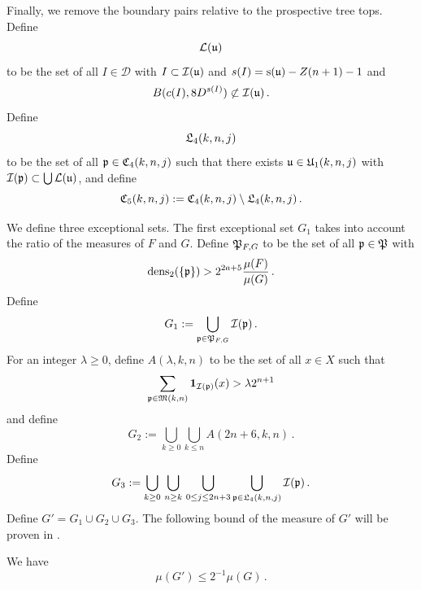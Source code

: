 Finally, we remove the boundary pairs relative to the prospective tree tops. Define
\begin{equation}
    \label{eq-L-def}
    \mathcal{L}({\mathfrak u})
\end{equation}
to be the set of all $I \in \mathcal{D}$ with $I \subset {\mathcal{I}}({\mathfrak u})$ and $s(I) = {\mathrm{s}}({\mathfrak u}) - Z(n+1) - 1$ and
\begin{equation}
    B(c(I), 8 D^{s(I)})\not \subset {\mathcal{I}}({\mathfrak u})\, .
\end{equation}
Define
\begin{equation}
    \label{eq-L4-def}
    {\mathfrak L}_4(k,n,j)
\end{equation}
to be the set of all ${\mathfrak p}\in {\mathfrak C}_4(k,n,j)$ such that there exists
${\mathfrak u}\in {\mathfrak U}_1(k,n,j)$
with ${\mathcal{I}}({\mathfrak p}) \subset \bigcup \mathcal{L}({\mathfrak u})$, and define
\begin{equation}\label{defc5}
{\mathfrak C}_5(k,n,j):={\mathfrak C}_4(k,n,j)
  \setminus {\mathfrak L}_4(k,n,j)\, .
\end{equation}


We define three exceptional sets.
The first exceptional set $G_1$ takes into account the ratio of the measures of $F$ and $G$.
Define ${\mathfrak P}_{F,G}$ to be the set of all ${\mathfrak p}\in {\mathfrak P}$
with
\begin{equation}
    \operatorname{\operatorname{dens}}_2(\{{\mathfrak p}\})> 2^{2a+5}\frac{\mu(F)}{\mu(G)}\,.
\end{equation}
Define
\begin{equation}\label{definegone}
    G_1:=\bigcup_{{\mathfrak p}\in {\mathfrak P}_{F,G} }{\mathcal{I}}({\mathfrak p})\, .
\end{equation}
For an integer $\lambda\ge 0$, define $A(\lambda,k,n)$ to be the set
of all $x\in X$ such that
\begin{equation}
    \label{eq-Aoverlap-def}
    \sum_{{\mathfrak p} \in \mathfrak{M}(k,n)}\mathbf{1}_{{\mathcal{I}}({\mathfrak p})}(x)>\lambda 2^{n+1}
\end{equation}
and define
\begin{equation}\label{definegone2}
    G_2:=
\bigcup_{k\ge 0}\bigcup_{k\le n}
A(2n+6,k,n)\, .
\end{equation}
Define
    \begin{equation}\label{defineg3}
        G_3 :=
        \bigcup_{k\ge 0}\, \bigcup_{n \geq k}\,
        \bigcup_{0\le j\le 2n+3}
        \bigcup_{{\mathfrak p} \in {\mathfrak L}_4 (k,n,j)}
        {\mathcal{I}}({\mathfrak p})\, .
     \end{equation}
Define $G'=G_1\cup G_2 \cup G_3$. The following bound of the measure of $G'$ will be proven in .
\begin{lemma}
    \label{exceptional-set}
    \leanok
    We have
    \begin{equation}
        \mu(G')\le 2^{-1}\mu(G)\, .
    \end{equation}
\end{lemma}


